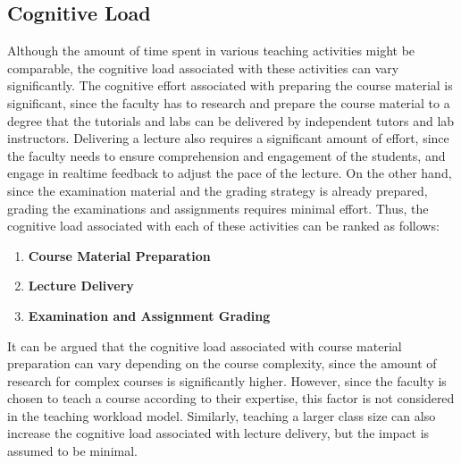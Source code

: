 \subsection{Cognitive Load}

Although the amount of time spent in various teaching activities might be comparable, the cognitive load associated with these activities can vary significantly. The cognitive effort associated with preparing the course material is significant, since the faculty has to research and prepare the course material to a degree that the tutorials and labs can be delivered by independent tutors and lab instructors. Delivering a lecture also requires a significant amount of effort, since the faculty needs to ensure comprehension and engagement of the students, and engage in realtime feedback to adjust the pace of the lecture. On the other hand, since the examination material and the grading strategy is already prepared, grading the examinations and assignments requires minimal effort. Thus, the cognitive load associated with each of these activities can be ranked as follows:

\begin{enumerate}
  \item \textbf{Course Material Preparation}
  \item \textbf{Lecture Delivery}
  \item \textbf{Examination and Assignment Grading}
\end{enumerate}

It can be argued that the cognitive load associated with course material preparation can vary depending on the course complexity, since the amount of research for complex courses is significantly higher. However, since the faculty is chosen to teach a course according to their expertise, this factor is not considered in the teaching workload model. Similarly, teaching a larger class size can also increase the cognitive load associated with lecture delivery, but the impact is assumed to be minimal.




